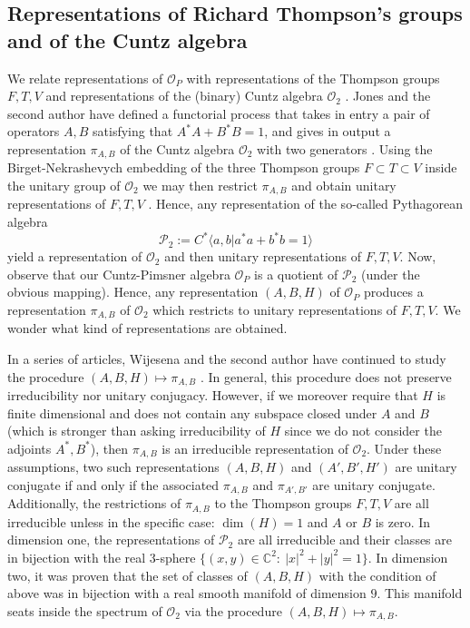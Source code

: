 \documentclass[12pt, a4paper]{amsart}
\def\dim{\operatorname{dim}}
\def\C{\mathbb{C}}
\newcommand{\CO}[0]{\mathcal{O}} \newcommand{\CP}[0]{\mathcal{P}}
\numberwithin{equation}{section}
\begin{document}
\subsection{Representations of Richard Thompson's groups and of the Cuntz algebra}\label{sec:FTVO}

We relate representations of $\CO_P$ with representations of the Thompson groups $F,T,V$ and representations of the (binary) Cuntz algebra $\CO_2$ \cite{CFP, Cuntz}.
Jones and the second author have defined a functorial process that takes in entry a pair of operators $A,B$ satisfying that $A^*A+B^*B=1$, and gives in output a representation $\pi_{A,B}$ of the Cuntz algebra $\CO_2$ with two generators \cite{Brothier-Jones19}. 
Using the Birget-Nekrashevych embedding of the three Thompson groups $F\subset T\subset V$ inside the unitary group of $\CO_2$ we may then restrict $\pi_{A,B}$ and obtain unitary representations of $F,T,V$ \cite{Birget03,Nekrashevych03}. 
Hence, any representation of the so-called Pythagorean algebra 
$$\CP_2:=C^*\langle a,b| a^*a+b^*b=1\rangle$$
yield a representation of $\CO_2$ and then unitary representations of $F,T,V.$
Now, observe that our Cuntz-Pimsner algebra $\CO_P$ is a quotient of $\CP_2$ (under the obvious mapping).
Hence, any representation $(A,B,H)$ of $\CO_P$ produces a representation $\pi_{A,B}$ of $\CO_2$ which restricts to unitary representations of $F,T,V$.
We wonder what kind of representations are obtained.

In a series of articles, Wijesena and the second author have continued to study the procedure $(A,B,H)\mapsto \pi_{A,B}$ \cite{Brothier-Wijesena25, Brothier-Wijesena26, Brothier-Wijesena24}.
In general, this procedure does not preserve irreducibility nor unitary conjugacy.
However, if we moreover require that $H$ is finite dimensional and does not contain any subspace closed under $A$ and $B$ (which is stronger than asking irreducibility of $H$ since we do not consider the adjoints $A^*,B^*$), then $\pi_{A,B}$ is an irreducible representation of $\CO_2$.
Under these assumptions, two such representations $(A,B,H)$ and $(A',B',H')$ are unitary conjugate if and only if the associated $\pi_{A,B}$ and $\pi_{A',B'}$ are unitary conjugate.
Additionally, the restrictions of $\pi_{A,B}$ to the Thompson groups $F,T,V$ are all irreducible unless in the specific case: $\dim(H)=1$ and $A$ or $B$ is zero.
In dimension one, the representations of $\CP_2$ are all irreducible and their classes are in bijection with the real 3-sphere $\{(x,y)\in\C^2:\ |x|^2+|y|^2=1\}.$
In dimension two, it was proven that the set of classes of $(A,B,H)$ with the condition of above was in bijection with a real smooth manifold of dimension $9$. 
This manifold seats inside the spectrum of $\CO_2$ via the procedure $(A,B,H)\mapsto \pi_{A,B}.$
\end{document}
